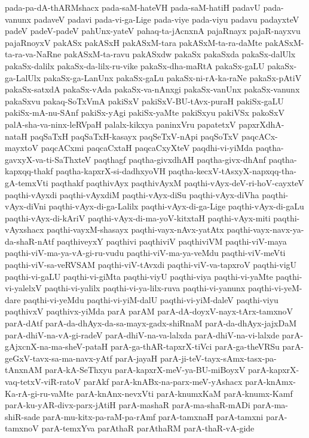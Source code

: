 {pada-pa-dA-thARMshacx
pada-saM-hateVH
pada-saM-hatiH
padavU
pada-vanunx
padaveV
padavi
pada-vi-ga-Lige
pada-viye
pada-viyu
padavu
padayxteV
padeV
padeV-padeV
pahUnx-yateV
pahaq-ta-jAcnxnA
pajaRnayx
pajaR-nayxvu
pajaRnoyxV
pakASx
pakASxH
pakASxM-tara
pakASxM-ta-ra-daMte
pakASxM-ta-ra-va-NaRne
pakASxM-ta-ravu
pakASxdw
pakaSx
pakaSxda
pakaSx-dalUlx
pakaSx-dalilx
pakaSx-da-lilx-ru-vike
pakaSx-dha-maRtA
pakaSx-gaLU
pakaSx-ga-LalUlx
pakaSx-ga-LanUnx
pakaSx-gaLu
pakaSx-ni-rA-ka-raNe
pakaSx-pAtiV
pakaSx-satxdA
pakaSx-vAda
pakaSx-va-nAnxgi
pakaSx-vanUnx
pakaSx-vanunx
pakaSxvu
pakaq-SoTxVmA
pakiSxV
pakiSxV-BU-tAvx-puraH
pakiSx-gaLU
pakiSx-mA-nu-SAnf
pakiSx-yAgi
pakiSx-yaMte
pakiSxyu
pakiVSx
pakoSxV
palA-sha-va-ninx-leRVpaH
palalx-kikxya
paninxVru
papatetxV
papxrXdhA-nataH
paqSaTxH
paqSaTxH-kasayx
paqSeTxV-nApi
paqSoTxV
paqcACx-mayxtoV
paqcACxmi
paqcaCxtaH
paqcaCxyXteV
paqdhi-vi-yiMda
paqtha-gavxyX-va-ti-SaThxteV
paqthagf
paqtha-givxdhAH
paqtha-givx-dhAnf
paqtha-kapxqq-thakf
paqtha-kapxrX-si-dadhxyoVH
paqtha-kecxV-tAsxyX-napxqq-tha-gA-temxVti
paqthakf
paqthivAyx
paqthivAyxM
paqthi-vAyx-deV-ri-hoV-cayxteV
paqthi-vAyxdi
paqthi-vAyxdiM
paqthi-vAyx-diSu
paqthi-vAyx-diVha
paqthi-vAyx-diVni
paqthi-vAyx-di-ga-Lalilx
paqthi-vAyx-di-ga-Lige
paqthi-vAyx-di-gaLu
paqthi-vAyx-di-kAriV
paqthi-vAyx-di-ma-yoV-kitxtaH
paqthi-vAyx-miti
paqthi-vAyxshacx
paqthi-vayxM-shasayx
paqthi-vayx-nAvx-yatAtx
paqthi-vayx-navx-ya-da-shaR-nAtf
paqthiveyxY
paqthivi
paqthiviV
paqthiviVM
paqthi-viV-maya
paqthi-viV-ma-ya-vA-gi-ru-vudu
paqthi-viV-ma-ya-veMdu
paqthi-viV-meVti
paqthi-viV-sa-veRVSAM
paqthi-viV-tAvxdi
paqthi-viV-va-tapxroV
paqthi-vigU
paqthi-vi-gaLU
paqthi-vi-giMta
paqthi-viyU
paqthi-viya
paqthi-vi-yaMte
paqthi-vi-yalelxV
paqthi-vi-yalilx
paqthi-vi-ya-lilx-ruva
paqthi-vi-yanunx
paqthi-vi-yeM-dare
paqthi-vi-yeMdu
paqthi-vi-yiM-dalU
paqthi-vi-yiM-daleV
paqthi-viyu
paqthivxV
paqthivx-yiMda
parA
parAM
parA-dA-doyxV-nayx-tArx-tamxnoV
parA-dAtf
parA-da-dhAyx-da-sa-mayx-gadx-shiRnaM
parA-da-dhAyx-jajxDaM
parA-dhiV-na-vA-gi-radeV
parA-dhiV-na-va-lalxda
parA-dhiV-na-vi-lalxde
parA-gAjxcnX-na-ma-sheV-pataH
parA-ga-thAR-tapxrX-tiVci
parA-ga-theVRSu
parA-geGxV-tavx-sa-ma-navx-yAtf
parA-jayaH
parA-ji-teV-tayx-sAmx-tasx-pa-tAnxnAM
parA-kA-SeThxyu
parA-kapxrX-meV-ya-BU-miBoyxV
parA-kapxrX-vaq-tetxV-viR-ratoV
parAkf
parA-knABx-na-parx-meV-yAshacx
parA-knAmx-Ka-rA-gi-ru-vaMte
parA-knAnx-nevxVti
parA-knumxKaM
parA-knumx-Kamf
parA-ku-yAR-divx-parx-jAtiH
parA-mashaR
parA-ma-shaR-mADi
parA-ma-shiR-sade
parA-mu-kitx-pa-raM-pa-rAmf
parA-tamxnaH
parA-tamxni
parA-tamxnoV
parA-temxYva
parAthaR
parAthaRM
parA-thaR-vA-gide
}
